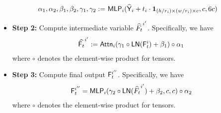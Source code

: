 \begin{definition}
\begin{itemize}
        \begin{align*}
            \alpha_1, \alpha_2, \beta_1, \beta_2, \gamma_1, \gamma_2 :=&~ \mathsf{MLP}_i(\widehat{\mathsf{Y}}_i + t_i \cdot {\bf 1}_{(h / r_i) \times (w/r_i) \times c},c,6c)
        \end{align*}
        \item {\bf Step 2:} Compute intermediate variable $\widehat{F_t}^{i'}$. Specifically, we have
        \begin{align*}
            \widehat{\mathsf{F}_t}^{i'}:= \mathsf{Attn}_i (\gamma_1 \circ \mathsf{LN}(\mathsf{F}_t^i) + \beta_1) \circ \alpha_1
        \end{align*}
        where $\circ$ denotes the element-wise product for tensors.

        \item {\bf Step 3:} Compute final output $\mathsf{F}_t^{i''}$. Specifically, we have
        \begin{align*}
            \mathsf{F}_t^{i''} = \mathsf{MLP}_i(\gamma_2 \circ \mathsf{LN}(\widehat{F_t}^{i'})+ \beta_2,c,c) \circ \alpha_2
        \end{align*}
        where $\circ$ denotes the element-wise product for tensors.
    \end{itemize}
\end{definition}



